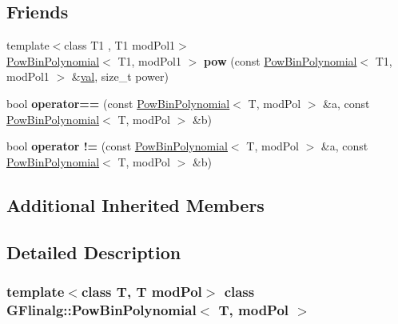 \subsection*{Friends}
\begin{DoxyCompactItemize}
\item 
\mbox{\label{class_g_flinalg_1_1_pow_bin_polynomial_a74889637141fb6f814b8fcfc4d7ef9c2}} 
{\footnotesize template$<$class T1 , T1 mod\+Pol1$>$ }\\\mbox{\hyperlink{class_g_flinalg_1_1_pow_bin_polynomial}{Pow\+Bin\+Polynomial}}$<$ T1, mod\+Pol1 $>$ {\bfseries pow} (const \mbox{\hyperlink{class_g_flinalg_1_1_pow_bin_polynomial}{Pow\+Bin\+Polynomial}}$<$ T1, mod\+Pol1 $>$ \&\mbox{\hyperlink{class_g_flinalg_1_1_basic_bin_polynomial_a6389212b0031b6d0a8e45cdb1392dbd7}{val}}, size\+\_\+t power)
\item 
\mbox{\label{class_g_flinalg_1_1_pow_bin_polynomial_a590fed76e42bb0fc5af854a30260a5dd}} 
bool {\bfseries operator==} (const \mbox{\hyperlink{class_g_flinalg_1_1_pow_bin_polynomial}{Pow\+Bin\+Polynomial}}$<$ T, mod\+Pol $>$ \&a, const \mbox{\hyperlink{class_g_flinalg_1_1_pow_bin_polynomial}{Pow\+Bin\+Polynomial}}$<$ T, mod\+Pol $>$ \&b)
\item 
\mbox{\label{class_g_flinalg_1_1_pow_bin_polynomial_a7a53d7367da87b35758b791324212f03}} 
bool {\bfseries operator !=} (const \mbox{\hyperlink{class_g_flinalg_1_1_pow_bin_polynomial}{Pow\+Bin\+Polynomial}}$<$ T, mod\+Pol $>$ \&a, const \mbox{\hyperlink{class_g_flinalg_1_1_pow_bin_polynomial}{Pow\+Bin\+Polynomial}}$<$ T, mod\+Pol $>$ \&b)
\end{DoxyCompactItemize}
\subsection*{Additional Inherited Members}


\subsection{Detailed Description}
\subsubsection*{template$<$class T, T mod\+Pol$>$\newline
class G\+Flinalg\+::\+Pow\+Bin\+Polynomial$<$ T, mod\+Pol $>$}

